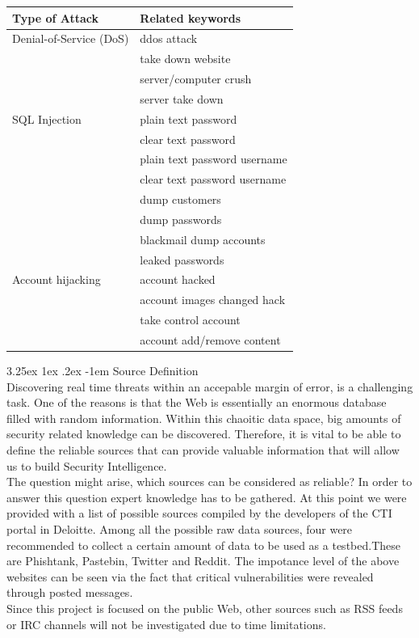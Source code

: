 \documentclass[12pt]{article}
\makeatletter
\renewcommand\paragraph{\@startsection{paragraph}{5}{\z@}%
  {3.25ex \@plus1ex \@minus.2ex}%
  {-1em}%
  {\normalfont\normalsize\bfseries}}
\makeatother
\begin{document}
\begin{center} 
\begin{longtable}{|l | l|}
\hline
Type of Attack & Related keywords \\
\hline
 Denial-of-Service (DoS) & ddos attack \\ 
 						& take down website \\ 
 						&  server/computer crush  \\
 						& server take down \\

\hline
SQL Injection 	& plain text password\\
				& clear text password \\
				& plain text password username \\
				& clear text password username\\
				& dump customers \\
				& dump passwords \\
				& blackmail dump accounts \\
				& leaked passwords \\
				
\hline
Account hijacking & account hacked \\
				  & account images changed hack \\
				  & take control account \\
				  & account add/remove content \\ 			  
\hline

\end{longtable}
\end{center}
\paragraph{Source Definition}
\hfill \break \\
Discovering real time threats within an accepable margin of error, is a challenging task. One of the reasons is that the Web is essentially an enormous database filled with random information. Within this chaoitic data space, big amounts of security related knowledge can be discovered. Therefore, it is vital to be able to define the reliable sources that can provide valuable information that will allow us to build Security Intelligence. \\

The question might arise, which sources can be considered as reliable? In order to answer this question expert knowledge has to be gathered. At this point we were provided with a list of possible sources compiled by the developers of the CTI portal in Deloitte. Among all the possible raw data sources, four were recommended to collect a certain amount of data to be used as a testbed.These are Phishtank, Pastebin, Twitter and Reddit. The impotance level of the above websites can be seen via the fact that critical vulnerabilities were revealed through posted messages\cite{list-2015-attacks}.\\
Since this project is focused on the public Web, other sources such as RSS feeds or IRC channels will not be investigated due to time limitations.   
\end{document}
